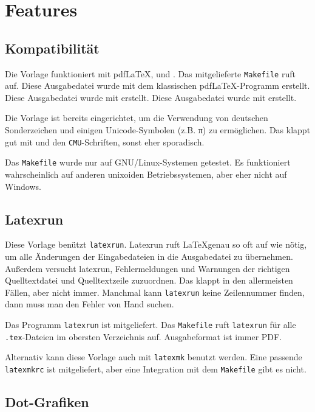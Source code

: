 \chapter{Features}

\section{Kompatibilität}

Die Vorlage funktioniert mit pdf\LaTeX, \XeLaTeX und \LuaLaTeX. Das mitgelieferte \texttt{Makefile}
ruft \XeLaTeX auf.
\ifPDFTeX
Diese Ausgabedatei wurde mit dem klassischen pdf\LaTeX-Programm erstellt.
\fi
\ifLuaTeX
Diese Ausgabedatei wurde mit \LuaLaTeX erstellt.
\fi
\ifXeTeX
Diese Ausgabedatei wurde mit \XeLaTeX erstellt.
\fi

Die Vorlage ist bereits eingerichtet, um die Verwendung von deutschen Sonderzeichen und
einigen Unicode-Symbolen (z.B. π) zu ermöglichen. Das klappt gut mit \XeTeX und den
\texttt{CMU}-Schriften, sonst eher sporadisch.

Das \texttt{Makefile} wurde nur auf GNU/Linux-Systemen getestet. Es funktioniert wahrscheinlich
auf anderen unixoiden Betriebssystemen, aber eher nicht auf Windows.

\section{Latexrun}

Diese Vorlage benützt \texttt{latexrun}\cite{latexrun}.
Latexrun ruft \LaTeX genau so oft auf wie nötig,
um alle Änderungen der Eingabedateien in die Ausgabedatei zu übernehmen.
Außerdem versucht latexrun, Fehlermeldungen und Warnungen
der richtigen Quelltextdatei und Quelltextzeile zuzuordnen.
Das klappt in den allermeisten Fällen, aber nicht immer. Manchmal kann \texttt{latexrun}
keine Zeilennummer finden, dann muss man den Fehler von Hand suchen.

Das Programm \texttt{latexrun} ist mitgeliefert. Das \texttt{Makefile} ruft \texttt{latexrun}
für alle \texttt{.tex}-Dateien im obersten Verzeichnis auf. Ausgabeformat ist immer PDF.

Alternativ kann diese Vorlage auch mit \texttt{latexmk} benutzt werden. Eine passende \texttt{latexmkrc}
ist mitgeliefert, aber eine Integration mit dem \texttt{Makefile} gibt es nicht.

\section{Dot-Grafiken}

